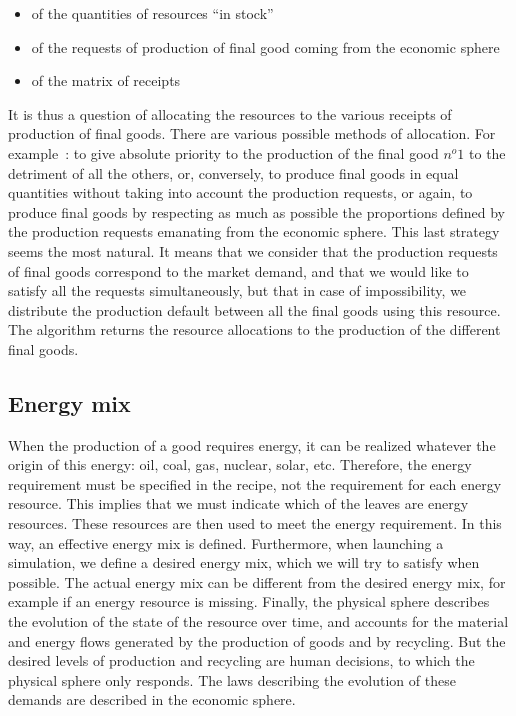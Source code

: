 \documentclass[12pt,a4paper]{article}%
\begin{document}
\begin{appendix}
\begin{itemize} 
	\item of the quantities of resources ``in stock'' 
	\item of the requests of production of final good coming from the economic sphere 
	\item of the matrix of receipts~ 
\end{itemize} 
It is thus a question of allocating the resources to the various receipts of production of final goods. There are various possible methods of allocation. For example~: to give absolute priority to the production of the final good $n^{o}1$ to the detriment of all the others, or, conversely, to produce final goods in equal quantities without taking into account the production requests, or again, to produce final goods by respecting as much as possible the proportions defined by the production requests emanating from the economic sphere.  This last strategy seems the most natural. It means that we consider that the production requests of final goods correspond to the market demand, and that we would like to satisfy all the requests simultaneously, but that in case of impossibility, we distribute the production default between all the final goods using this resource. The algorithm returns the resource allocations to the production of the different final goods.  

\subsection{Energy mix} 
When the production of a good requires energy, it can be realized whatever the origin of this energy: oil, coal, gas, nuclear, solar, etc. Therefore, the energy requirement must be specified in the recipe, not the requirement for each energy resource. This implies that we must indicate which of the leaves are energy resources. These resources are then used to meet the energy requirement. In this way, an effective energy mix is defined.  Furthermore, when launching a simulation, we define a desired energy mix, which we will try to satisfy when possible. The actual energy mix can be different from the desired energy mix, for example if an energy resource is missing.  Finally, the physical sphere describes the evolution of the state of the resource over time, and accounts for the material and energy flows generated by the production of goods and by recycling. But the desired levels of production and recycling are human decisions, to which the physical sphere only responds. The laws describing the evolution of these demands are described in the economic sphere. 


\end{appendix}
\end{document}
